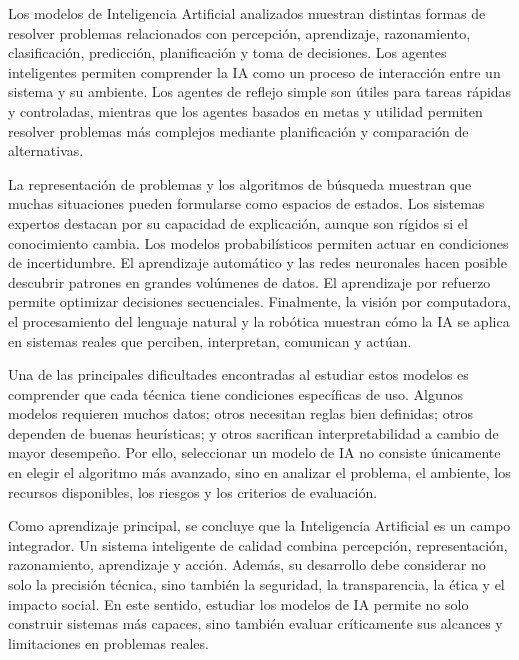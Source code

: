 Los modelos de Inteligencia Artificial analizados muestran distintas formas de resolver problemas relacionados con percepción, aprendizaje, razonamiento, clasificación, predicción, planificación y toma de decisiones. Los agentes inteligentes permiten comprender la IA como un proceso de interacción entre un sistema y su ambiente. Los agentes de reflejo simple son útiles para tareas rápidas y controladas, mientras que los agentes basados en metas y utilidad permiten resolver problemas más complejos mediante planificación y comparación de alternativas.

La representación de problemas y los algoritmos de búsqueda muestran que muchas situaciones pueden formularse como espacios de estados. Los sistemas expertos destacan por su capacidad de explicación, aunque son rígidos si el conocimiento cambia. Los modelos probabilísticos permiten actuar en condiciones de incertidumbre. El aprendizaje automático y las redes neuronales hacen posible descubrir patrones en grandes volúmenes de datos. El aprendizaje por refuerzo permite optimizar decisiones secuenciales. Finalmente, la visión por computadora, el procesamiento del lenguaje natural y la robótica muestran cómo la IA se aplica en sistemas reales que perciben, interpretan, comunican y actúan.

Una de las principales dificultades encontradas al estudiar estos modelos es comprender que cada técnica tiene condiciones específicas de uso. Algunos modelos requieren muchos datos; otros necesitan reglas bien definidas; otros dependen de buenas heurísticas; y otros sacrifican interpretabilidad a cambio de mayor desempeño. Por ello, seleccionar un modelo de IA no consiste únicamente en elegir el algoritmo más avanzado, sino en analizar el problema, el ambiente, los recursos disponibles, los riesgos y los criterios de evaluación.

Como aprendizaje principal, se concluye que la Inteligencia Artificial es un campo integrador. Un sistema inteligente de calidad combina percepción, representación, razonamiento, aprendizaje y acción. Además, su desarrollo debe considerar no solo la precisión técnica, sino también la seguridad, la transparencia, la ética y el impacto social. En este sentido, estudiar los modelos de IA permite no solo construir sistemas más capaces, sino también evaluar críticamente sus alcances y limitaciones en problemas reales.

